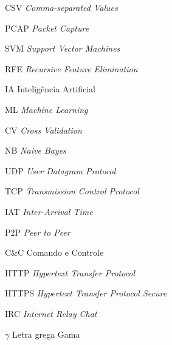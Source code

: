 \documentclass[
	12pt,				%
	openright,			%
	oneside,			%
	a4paper,			%
	english,			%
	french,				%
	spanish,			%
	brazil,				%
	]{abntex2}
\begin{document}

\listoffigures*
\cleardoublepage



\listoftables*
\cleardoublepage



\begin{siglas}
  \item [CSV] \textit{Comma-separated Values} 
  \item [PCAP] \textit{Packet Capture}
  \item[SVM] \textit{Support Vector Machines}
  \item[RFE] \textit{Recursive Feature Elimination}
  \item[IA] Inteligência Artificial
  \item[ML] \textit{Machine Learning}
  \item[CV] \textit{Cross Validation}
  \item[NB] \textit{Naive Bayes}
  \item[UDP] \textit{User Datagram Protocol}
  \item[TCP] \textit{Transmission Control Protocol}
  \item[IAT] \textit{Inter-Arrival Time}
  \item[P2P] \textit {Peer to Peer}
  \item[C\&C] Comando e Controle
  \item[HTTP] \textit{Hypertext Transfer Protocol}
  \item[HTTPS] \textit{Hypertext Transfer Protocol Secure}
  \item[IRC] \textit{Internet Relay Chat}
\end{siglas}


\begin{simbolos}
  \item[$ \gamma $] Letra grega Gama
\end{simbolos}
\end{document}
